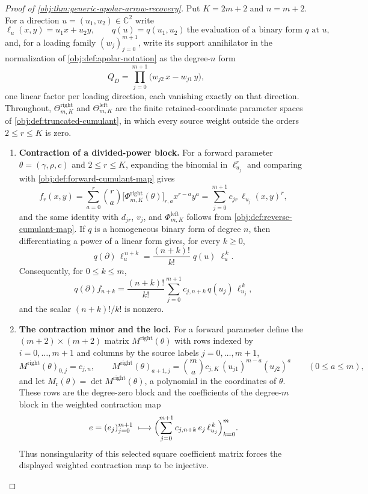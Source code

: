 \begin{proof}[Proof of \cref{obj:thm:generic-apolar-arrow-recovery}]
Put \(K=2m+2\) and \(n=m+2\).  For a direction \(u=(u_1,u_2)\in\mathbb C^2\) write
\[
\ell_u(x,y)=u_1x+u_2y,
\qquad
q(u)=q(u_1,u_2)\ \text{the evaluation of a binary form }q\text{ at }u,
\]
and, for a loading family \((w_j)_{j=0}^{m+1}\), write its support annihilator in the normalization of \cref{obj:def:apolar-notation} as the degree-\(n\) form
\[
Q_D=\prod_{j=0}^{m+1}\bigl(w_{j2}\,x-w_{j1}\,y\bigr),
\]
one linear factor per loading direction, each vanishing exactly on that direction.  Throughout, \(\Theta^{\mathrm{right}}_{m,K}\) and \(\Theta^{\mathrm{left}}_{m,K}\) are the finite retained-coordinate parameter spaces of \cref{obj:def:truncated-cumulant}, in which every source weight outside the orders \(2\le r\le K\) is zero.

\begin{enumerate}
\item \textbf{Contraction of a divided-power block.}  For a forward parameter \(\theta=(\gamma,\rho,c)\) and \(2\le r\le K\), expanding the binomial in \(\ell_{u_j}^r\) and comparing with \cref{obj:def:forward-cumulant-map} gives
\[
f_r(x,y)=\sum_{a=0}^{r}\binom{r}{a}\bigl[\Phi^{\mathrm{right}}_{m,K}(\theta)\bigr]_{r,a}x^{r-a}y^{a}
=\sum_{j=0}^{m+1}c_{jr}\,\ell_{u_j}(x,y)^{r},
\]
and the same identity with \(d_{jr}\), \(v_j\), and \(\Phi^{\mathrm{left}}_{m,K}\) follows from \cref{obj:def:reverse-cumulant-map}.  If \(q\) is a homogeneous binary form of degree \(n\), then differentiating a power of a linear form gives, for every \(k\ge0\),
\[
q(\partial)\,\ell_u^{\,n+k}=\frac{(n+k)!}{k!}\;q(u)\;\ell_u^{\,k}.
\]
Consequently, for \(0\le k\le m\),
\[
q(\partial)f_{n+k}
=\frac{(n+k)!}{k!}\sum_{j=0}^{m+1}c_{j,n+k}\,q(u_j)\,\ell_{u_j}^{\,k},
\]
and the scalar \((n+k)!/k!\) is nonzero.

\item \textbf{The contraction minor and the loci.}  For a forward parameter define the \((m+2)\times(m+2)\) matrix \(M^{\mathrm{right}}(\theta)\) with rows indexed by \(i=0,\ldots,m+1\) and columns by the source labels \(j=0,\ldots,m+1\),
\[
M^{\mathrm{right}}(\theta)_{0,j}=c_{j,n},
\qquad
M^{\mathrm{right}}(\theta)_{a+1,j}=\binom{m}{a}c_{j,K}\,(u_{j1})^{m-a}(u_{j2})^{a}
\qquad(0\le a\le m),
\]
and let \(M_{\mathrm r}(\theta)=\det M^{\mathrm{right}}(\theta)\), a polynomial in the coordinates of \(\theta\).  These rows are the degree-zero block and the coefficients of the degree-\(m\) block in the weighted contraction map
\[
e=(e_j)_{j=0}^{m+1}\ \longmapsto
\Bigl(\sum_{j=0}^{m+1}c_{j,n+k}\,e_j\,\ell_{u_j}^{\,k}\Bigr)_{k=0}^{m}.
\]
Thus nonsingularity of this selected square coefficient matrix forces the displayed weighted contraction map to be injective.


\end{enumerate}
\end{proof}
